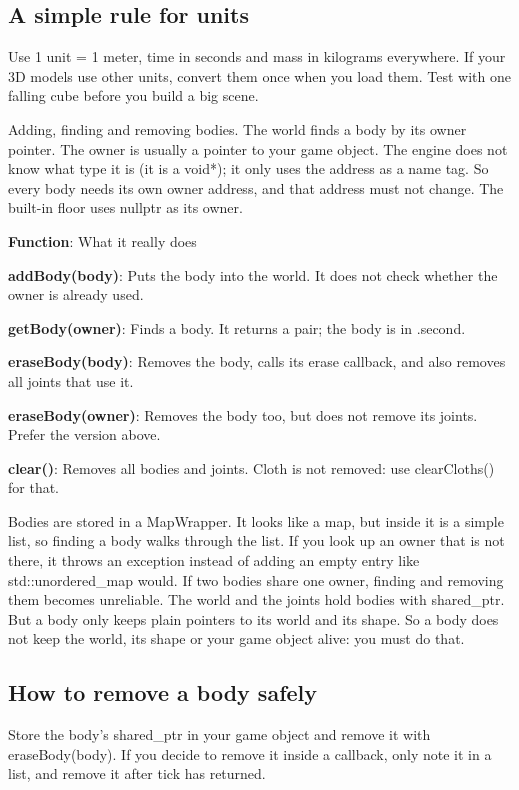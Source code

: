 \documentclass[11pt,a4paper]{article}
\begin{document}
\subsection*{A simple rule for units}
Use 1 unit = 1 meter, time in seconds and mass in kilograms everywhere. If your 3D models use other units, convert them once when you load them. Test with one falling cube before you build a big scene.

\label{vpe-core-4}
Adding, finding and removing bodies. The world finds a body by its owner pointer. The owner is usually a pointer to your game object. The engine does not know what type it is (it is a void*); it only uses the address as a name tag. So every body needs its own owner address, and that address must not change. The built-in floor uses nullptr as its owner.

\textbf{Function}: What it really does

\textbf{addBody(body)}: Puts the body into the world. It does not check whether the owner is already used.

\textbf{getBody(owner)}: Finds a body. It returns a pair; the body is in .second.

\textbf{eraseBody(body)}: Removes the body, calls its erase callback, and also removes all joints that use it.

\textbf{eraseBody(owner)}: Removes the body too, but does not remove its joints. Prefer the version above.

\textbf{clear()}: Removes all bodies and joints. Cloth is not removed: use clearCloths() for that.

Bodies are stored in a MapWrapper. It looks like a map, but inside it is a simple list, so finding a body walks through the list. If you look up an owner that is not there, it throws an exception instead of adding an empty entry like std::unordered\_map would. If two bodies share one owner, finding and removing them becomes unreliable. The world and the joints hold bodies with shared\_ptr. But a body only keeps plain pointers to its world and its shape. So a body does not keep the world, its shape or your game object alive: you must do that.

\subsection*{How to remove a body safely}
Store the body's shared\_ptr in your game object and remove it with eraseBody(body). If you decide to remove it inside a callback, only note it in a list, and remove it after tick has returned.
\end{document}
